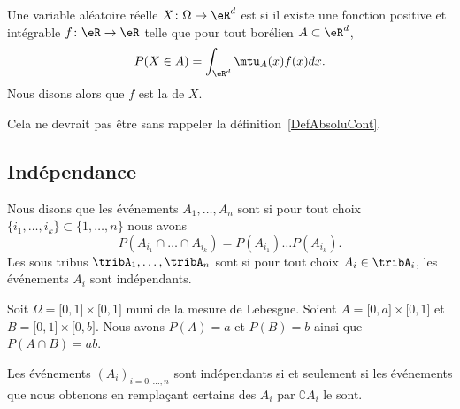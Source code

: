 \begin{definition}      \label{DEFooRNKZooRczFwB}
	Une variable aléatoire réelle \( X\colon \Omega\to \eR^d\) est  si il existe une fonction positive et intégrable \( f\colon \eR\to \eR\) telle que pour tout borélien \( A\subset \eR^d\),
	\begin{equation}
		P(X\in A)=\int_{\eR^d}\mtu_A(x)f(x)dx.
	\end{equation}
	Nous disons alors que \( f\) est la  de \( X\).
\end{definition}
Cela ne devrait pas être sans rappeler la définition~\ref{DefAbsoluCont}.

\subsection{Indépendance}

\begin{definition}      \label{DEFooVYCUooKWvReO}
	Nous disons que les événements \( A_1,\ldots,A_n\) sont  si pour tout choix \( \{ i_1,\ldots,i_k \}\subset\{ 1,\ldots,n \}\) nous avons
	\begin{equation}
		P(A_{i_1}\cap\ldots\cap A_{i_k})=P(A_{i_1})\ldots P(A_{i_k}).
	\end{equation}
	Les sous tribus \( \tribA_1,\ldots,\tribA_n\) sont  si pour tout choix \( A_i\in \tribA_i\), les événements \( A_i\) sont indépendants.
\end{definition}

\begin{example}
	Soit \( \Omega=\mathopen[ 0 , 1 \mathclose]\times \mathopen[ 0 , 1 \mathclose]\) muni de la mesure de Lebesgue. Soient \( A=\mathopen[ 0 , a \mathclose]\times \mathopen[ 0 , 1 \mathclose]\) et \( B=\mathopen[ 0 , 1 \mathclose]\times \mathopen[ 0 , b \mathclose]\). Nous avons \( P(A)=a\) et \( P(B)=b\) ainsi que \( P(A\cap B)=ab\).
\end{example}

\begin{lemma}       \label{LemIndepEvenCompl}
	Les événements \( (A_i)_{i=0,\ldots,n}\) sont indépendants si et seulement si les événements que nous obtenons en remplaçant certains des \( A_i\) par \( \complement A_i\) le sont.
\end{lemma}

